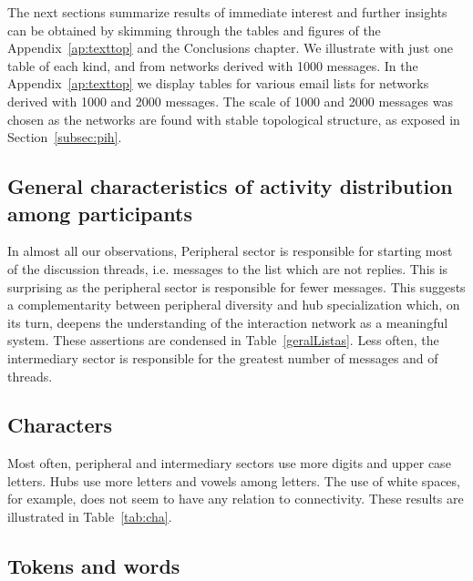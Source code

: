 The next sections summarize results of immediate interest
and further insights can be obtained by skimming through
the tables and figures of the Appendix~\ref{ap:texttop} and the Conclusions chapter.
We illustrate with just one table of each kind,
and from networks derived with 1000 messages.
In the Appendix~\ref{ap:texttop} we display tables for various email lists
for networks derived with 1000 and 2000 messages.
The scale of 1000 and 2000 messages was chosen as the networks are found with
stable topological structure, as exposed in Section~\ref{subsec:pih}.

\subsection{General characteristics of activity distribution among participants}\label{sec:gen}

In almost all our observations,
Peripheral sector is responsible for starting most of the discussion threads,
i.e. messages to the list which are not replies.
This is surprising as the peripheral sector is responsible for fewer messages.
This suggests a complementarity between peripheral diversity and hub specialization
which, on its turn, deepens the understanding of the interaction network as a meaningful system. 
These assertions are condensed in Table~\ref{geralListas}.
Less often, the intermediary sector is responsible for the greatest number of messages
and of threads.


\subsection{Characters}\label{sec:cha}

Most often, peripheral and intermediary sectors use more digits and upper case letters.
Hubs use more letters and vowels among letters.
The use of white spaces, for example, does not seem to have any relation to connectivity. 
These results are illustrated in Table~\ref{tab:cha}.

\subsection{Tokens and words}\label{subsec:tw}
%


